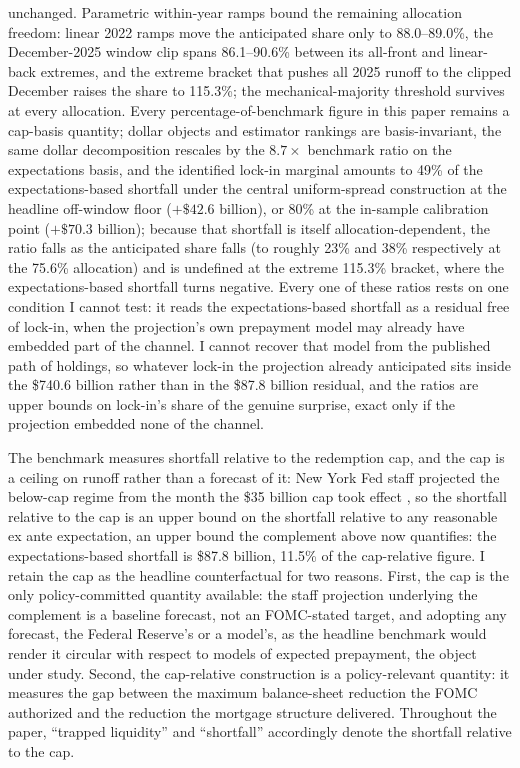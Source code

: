 \documentclass[12pt]{article}
\begin{document}
unchanged. Parametric within-year ramps bound the remaining allocation freedom: linear 2022 ramps move the anticipated share only to 88.0--89.0\%, the December-2025 window clip spans 86.1--90.6\% between its all-front and linear-back extremes, and the extreme bracket that pushes all 2025 runoff to the clipped December raises the share to 115.3\%; the mechanical-majority threshold survives at every allocation. Every percentage-of-benchmark figure in this paper remains a cap-basis quantity; dollar objects and estimator rankings are basis-invariant, the same dollar decomposition rescales by the $8.7\times$ benchmark ratio on the expectations basis, and the identified lock-in marginal amounts to 49\% of the expectations-based shortfall under the central uniform-spread construction at the headline off-window floor ($+\$42.6$ billion), or 80\% at the in-sample calibration point ($+\$70.3$ billion); because that shortfall is itself allocation-dependent, the ratio falls as the anticipated share falls (to roughly 23\% and 38\% respectively at the 75.6\% allocation) and is undefined at the extreme 115.3\% bracket, where the expectations-based shortfall turns negative. Every one of these ratios rests on one condition I cannot test: it reads the expectations-based shortfall as a residual free of lock-in, when the projection's own prepayment model may already have embedded part of the channel. I cannot recover that model from the published path of holdings, so whatever lock-in the projection already anticipated sits inside the \$740.6 billion rather than in the \$87.8 billion residual, and the ratios are upper bounds on lock-in's share of the genuine surprise, exact only if the projection embedded none of the channel.

The benchmark measures shortfall relative to the redemption cap, and the cap is a ceiling on runoff rather than a forecast of it: New York Fed staff projected the below-cap regime from the month the \$35 billion cap took effect \citep{nyfed2022}, so the shortfall relative to the cap is an upper bound on the shortfall relative to any reasonable ex ante expectation, an upper bound the complement above now quantifies: the expectations-based shortfall is \$87.8 billion, 11.5\% of the cap-relative figure. I retain the cap as the headline counterfactual for two reasons. First, the cap is the only policy-committed quantity available: the staff projection underlying the complement is a baseline forecast, not an FOMC-stated target, and adopting any forecast, the Federal Reserve's or a model's, as the headline benchmark would render it circular with respect to models of expected prepayment, the object under study. Second, the cap-relative construction is a policy-relevant quantity: it measures the gap between the maximum balance-sheet reduction the FOMC authorized and the reduction the mortgage structure delivered. Throughout the paper, ``trapped liquidity'' and ``shortfall'' accordingly denote the shortfall relative to the cap.
\end{document}
